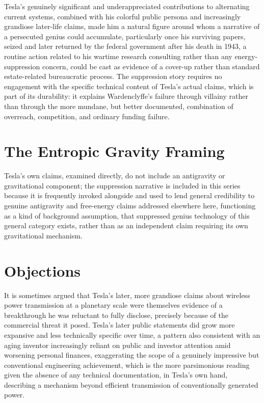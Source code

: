 \documentclass[11pt]{article}
\begin{document}
Tesla's genuinely significant and underappreciated contributions to alternating current systems, combined with his colorful public persona and increasingly grandiose later-life claims, made him a natural figure around whom a narrative of a persecuted genius could accumulate, particularly once his surviving papers, seized and later returned by the federal government after his death in 1943, a routine action related to his wartime research consulting rather than any energy-suppression concern, could be cast as evidence of a cover-up rather than standard estate-related bureaucratic process. The suppression story requires no engagement with the specific technical content of Tesla's actual claims, which is part of its durability: it explains Wardenclyffe's failure through villainy rather than through the more mundane, but better documented, combination of overreach, competition, and ordinary funding failure.

\section{The Entropic Gravity Framing}

Tesla's own claims, examined directly, do not include an antigravity or gravitational component; the suppression narrative is included in this series because it is frequently invoked alongside and used to lend general credibility to genuine antigravity and free-energy claims addressed elsewhere here, functioning as a kind of background assumption, that suppressed genius technology of this general category exists, rather than as an independent claim requiring its own gravitational mechanism.

\section{Objections}

It is sometimes argued that Tesla's later, more grandiose claims about wireless power transmission at a planetary scale were themselves evidence of a breakthrough he was reluctant to fully disclose, precisely because of the commercial threat it posed. Tesla's later public statements did grow more expansive and less technically specific over time, a pattern also consistent with an aging inventor increasingly reliant on public and investor attention amid worsening personal finances, exaggerating the scope of a genuinely impressive but conventional engineering achievement, which is the more parsimonious reading given the absence of any technical documentation, in Tesla's own hand, describing a mechanism beyond efficient transmission of conventionally generated power.
\end{document}
